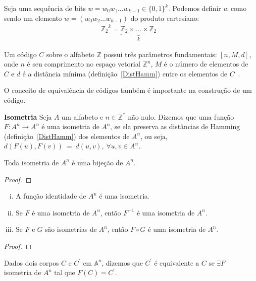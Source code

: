 \begin{definition} Seja uma sequência de bits $w=w_0w_1 \ldots w_{k-1} \in \{0, 1\}^k$. Podemos definir $w$ como sendo um elemento $w=(w_0w_2 \ldots w_{k-1})$ do produto cartesiano:
\begin{align*}
{\mathbb{Z}_2}^k=\underbrace{\mathbb{Z}_2 \times \ldots \times \mathbb{Z}_2}_{k}
\end{align*}
\end{definition}

Um código $C$ sobre o alfabeto $\mathbb{Z}$ possui três parâmetros fundamentais: $[n,M,d]$, onde $n$ é seu comprimento no espaço vetorial $\mathbb{Z}^n$, $M$ é o número de elementos de $C$ e $d$ é a distância mínima (definição~\ref{DistHamm}) entre os elementos de $C$~\cite{Hefez:2008}.

O conceito de equivalência de códigos também é importante na construção de um código.

\begin{definition} {\bf Isometria} \label{Isometria}  Seja $A$ um alfabeto e $n \in \mathbb{Z}^{*}$ não nulo. Dizemos que uma função $F: A^n \rightarrow A^n$ é uma isometria de $A^n$, se ela preserva as distâncias de Hamming (definição~\ref{DistHamm}) dos elementos de $A^n$, ou seja, $d(F(u),F(v))\ =\ d(u,v),\ \forall u,v \in A^n$.
\end{definition}

\begin{proposition} Toda isometria de $A^n$ é uma bijeção de $A^n$.
\end{proposition}

\begin{proof}
\end{proof}

\begin{proposition} 
   \begin{enumerate}[(i)]
      \item A função identidade de $A^n$ é uma isometria.
      \item Se $F$ é uma isometria de $A^n$, então $F^{-1}$ é uma isometria de $A^n$.
      \item Se $F$ e $G$ são isometrias de $A^n$, então $F \circ G$ é uma isometria de $A^n$.
   \end{enumerate}
\end{proposition}

\begin{proof}
\end{proof}

\begin{definition} Dados dois corpos $C$ e $C^{'}$ em $\mathbb{A}^n$, dizemos que $C^{'}$ é equivalente a $C$ se $\exists F$ isometria de $A^n$ tal que $F(C)=C^{'}$.
\end{definition}

